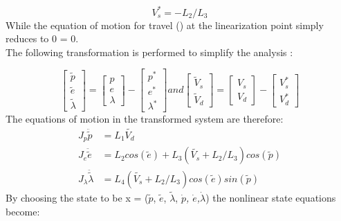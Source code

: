 \begin{equation}
  V^{*}_{s} = -L_{2} / L_{3}
\end{equation}
While the equation of motion for travel () at the linearization point simply reduces to 0 = 0.\\
The following transformation is performed to simplify the analysis
:

\begin{equation}
  \begin{bmatrix}
    \tilde{p} \\
    \tilde{e} \\
    \tilde{\lambda}
  \end{bmatrix}
  =
  \begin{bmatrix}
    p \\
    e \\
    \lambda
  \end{bmatrix}
  -
  \begin{bmatrix}
    p^{*} \\
    e^{*} \\
    \lambda^{*}
  \end{bmatrix}
  and
  \begin{bmatrix}
    \tilde{V}_{s} \\
    \tilde{V}_{d}
  \end{bmatrix}
  =
  \begin{bmatrix}
    V_{s} \\
    V_{d}
  \end{bmatrix}
  -
  \begin{bmatrix}
    V^{*}_{s} \\
    V^{*}_{d}
  \end{bmatrix}
\end{equation}
The equations of motion in the transformed system are therefore:
\begin{subequations}
  \begin{align}
    J_p\ddot{\tilde{p}} &= L_1\tilde{V_d} \\
    J_e\ddot{\tilde{e}} &= L_2cos(\tilde{e}) + L_3(\tilde{V_s}+L_2/L_3)cos(\tilde{p}) \\
    J_{\lambda}\ddot{\tilde{\lambda}} &= L_4(\tilde{V_s}+L_2/L_3)cos(\tilde{e})sin(\tilde{p})
  \end{align}
\end{subequations}
By choosing the state to be x = ($\tilde{p}$, $\tilde{e}$,
$\tilde{\lambda}$, \textit{$\dot{p}$, $\dot{e}$,$\dot{\lambda}$}) the
nonlinear state equations become:

